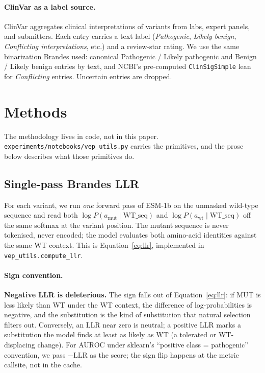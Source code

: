 \documentclass{article}
\begin{document}
\paragraph{ClinVar as a label source.} ClinVar
\citep{landrum2018clinvar} aggregates clinical interpretations of
variants from labs, expert panels, and submitters. Each entry carries a
text label (\emph{Pathogenic}, \emph{Likely benign}, \emph{Conflicting
interpretations}, etc.) and a review-star rating. We use the same
binarization Brandes used: canonical Pathogenic / Likely pathogenic and
Benign / Likely benign entries by text, and NCBI's pre-computed
\texttt{ClinSigSimple} lean for \emph{Conflicting} entries. Uncertain
entries are dropped.

\section{Methods}
\label{sec:methods}

The methodology lives in code, not in this paper.
\texttt{experiments/notebooks/vep\_utils.py} carries the primitives, and
the prose below describes what those primitives do.

\subsection{Single-pass Brandes LLR}
\label{sec:methods:llr}

For each variant, we run \emph{one} forward pass of ESM-1b on the
unmasked wild-type sequence and read both \(\log P(a_{\mathrm{mut}}
\mid \mathrm{WT\_seq})\) and \(\log P(a_{\mathrm{wt}} \mid
\mathrm{WT\_seq})\) off the same softmax at the variant position. The
mutant sequence is never tokenised, never encoded; the model evaluates
both amino-acid identities against the same WT context. This is
Equation~\ref{eq:llr}, implemented in \texttt{vep\_utils.compute\_llr}.

\paragraph{Sign convention.} \textbf{Negative LLR is deleterious.} The
sign falls out of Equation~\ref{eq:llr}: if MUT is less likely than WT
under the WT context, the difference of log-probabilities is negative,
and the substitution is the kind of substitution that natural selection
filters out. Conversely, an LLR near zero is neutral; a positive LLR
marks a substitution the model finds at least as likely as WT (a
tolerated or WT-displacing change). For AUROC under sklearn's
\enquote{positive class = pathogenic} convention, we pass \(-\mathrm{LLR}\)
as the score; the sign flip happens at the metric callsite, not in the
cache.
\end{document}
